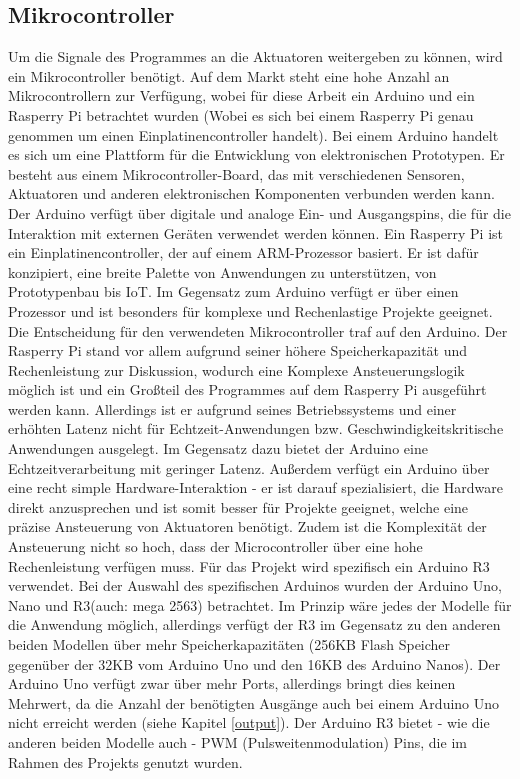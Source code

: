 \subsection{Mikrocontroller}\label{Ansteuerung}
Um die Signale des Programmes an die Aktuatoren weitergeben zu können, wird ein Mikrocontroller benötigt.
Auf dem Markt steht eine hohe Anzahl an Mikrocontrollern zur Verfügung, wobei für diese Arbeit ein Arduino und ein
Rasperry Pi betrachtet wurden (Wobei es sich bei einem Rasperry Pi genau genommen um einen Einplatinencontroller
handelt). \newline
Bei einem Arduino handelt es sich um eine Plattform für die Entwicklung von elektronischen Prototypen. Er besteht aus
einem Mikrocontroller-Board, das mit verschiedenen Sensoren, Aktuatoren und anderen elektronischen Komponenten
verbunden werden kann. Der Arduino verfügt über digitale und analoge Ein- und Ausgangspins, die für die Interaktion mit
externen Geräten verwendet werden können. \newline
Ein Rasperry Pi ist ein Einplatinencontroller, der auf einem ARM-Prozessor basiert. Er ist dafür konzipiert, eine breite
Palette von Anwendungen zu unterstützen, von Prototypenbau bis IoT.
Im Gegensatz zum Arduino verfügt er über einen Prozessor und ist besonders für komplexe und Rechenlastige
Projekte geeignet.\newline
Die Entscheidung für den verwendeten Mikrocontroller traf auf den Arduino. Der Rasperry Pi stand vor allem aufgrund
seiner höhere Speicherkapazität und Rechenleistung zur Diskussion, wodurch eine Komplexe Ansteuerungslogik
möglich ist und ein Großteil des Programmes auf dem Rasperry Pi ausgeführt werden kann. Allerdings ist er aufgrund
seines Betriebssystems und einer erhöhten Latenz nicht für Echtzeit-Anwendungen bzw. Geschwindigkeitskritische
Anwendungen ausgelegt. Im Gegensatz dazu bietet der Arduino eine Echtzeitverarbeitung mit geringer Latenz.
Außerdem verfügt ein Arduino über eine recht simple Hardware-Interaktion - er ist darauf spezialisiert, die
Hardware direkt anzusprechen und ist somit besser für Projekte geeignet, welche eine präzise Ansteuerung von
Aktuatoren benötigt. Zudem ist die Komplexität der Ansteuerung nicht so hoch, dass der Microcontroller über eine
hohe Rechenleistung verfügen muss. \newline
Für das Projekt wird spezifisch ein Arduino R3 verwendet. Bei der Auswahl des spezifischen Arduinos wurden der Arduino
Uno, Nano und R3(auch: mega 2563) betrachtet. Im Prinzip wäre jedes der Modelle für die Anwendung möglich, allerdings
verfügt der R3 im Gegensatz zu den anderen beiden Modellen über mehr Speicherkapazitäten (256KB Flash Speicher
gegenüber der 32KB vom Arduino Uno und den 16KB des Arduino Nanos). Der Arduino Uno verfügt zwar über mehr Ports,
allerdings bringt dies keinen Mehrwert, da die Anzahl der benötigten Ausgänge auch bei einem Arduino Uno nicht erreicht werden
(siehe Kapitel \ref{output}).
Der Arduino R3 bietet - wie die anderen beiden Modelle auch - PWM (Pulsweitenmodulation) Pins, die im Rahmen des Projekts
genutzt wurden.

